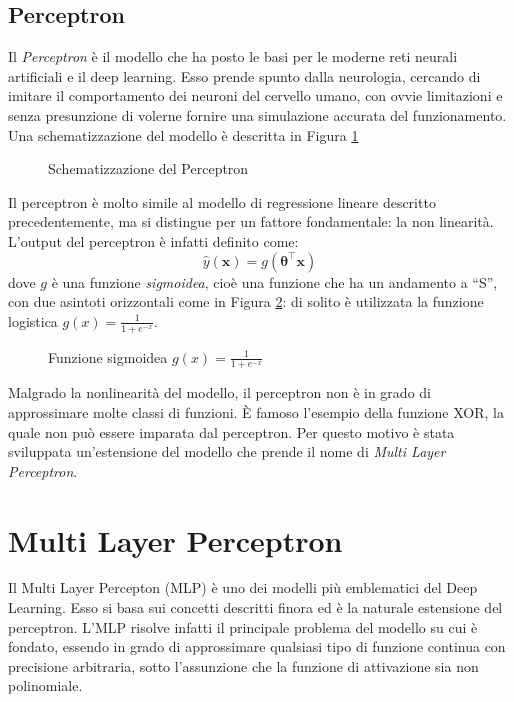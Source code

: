 \subsection{Perceptron}
Il \emph{Perceptron} è il modello che ha posto le basi per le moderne reti
neurali artificiali e il deep learning. Esso prende spunto dalla neurologia,
cercando di imitare il comportamento dei neuroni del cervello umano, con ovvie
limitazioni e senza presunzione di volerne fornire una simulazione accurata del
funzionamento. Una schematizzazione del modello è descritta in Figura
\ref{fig:perceptron}
\begin{figure}[H]
  \caption{Schematizzazione del Perceptron}
  \label{fig:perceptron}
\end{figure}

Il perceptron è molto simile al modello di regressione lineare descritto
precedentemente, ma si distingue per un fattore fondamentale: la non linearità.
L'output del perceptron è infatti definito come:
$$\hat{y}(\bm x) = g(\bm \theta^\intercal \bm x)$$
dove $g$ è una funzione \emph{sigmoidea}, cioè una funzione che ha un andamento
a ``S'', con due asintoti orizzontali come in Figura \ref{fig:sigmoid}: di
solito è utilizzata la funzione logistica $\displaystyle g(x) = \frac{1}{1 + e^{-x}}$.
\begin{figure}[H]
  \caption{Funzione sigmoidea $\displaystyle g(x) = \frac{1}{1 + e^{-x}}$ }
  \label{fig:sigmoid}
\end{figure}

Malgrado la nonlinearità del modello, il perceptron non è in grado di
approssimare molte classi di funzioni. È famoso l'esempio della funzione XOR,
la quale non può essere imparata dal perceptron. Per questo motivo è stata
sviluppata un'estensione del modello che prende il nome di \emph{Multi Layer
  Perceptron}.
\section{Multi Layer Perceptron}
Il Multi Layer Percepton (MLP) è uno dei modelli più emblematici del Deep
Learning. Esso si basa sui concetti descritti finora ed è la naturale
estensione del perceptron. L'MLP risolve infatti il principale problema del
modello su cui è fondato, essendo in grado di approssimare qualsiasi tipo di
funzione continua con precisione arbitraria, sotto l'assunzione che la
funzione di attivazione sia non polinomiale\cite{universal-approximator}.


